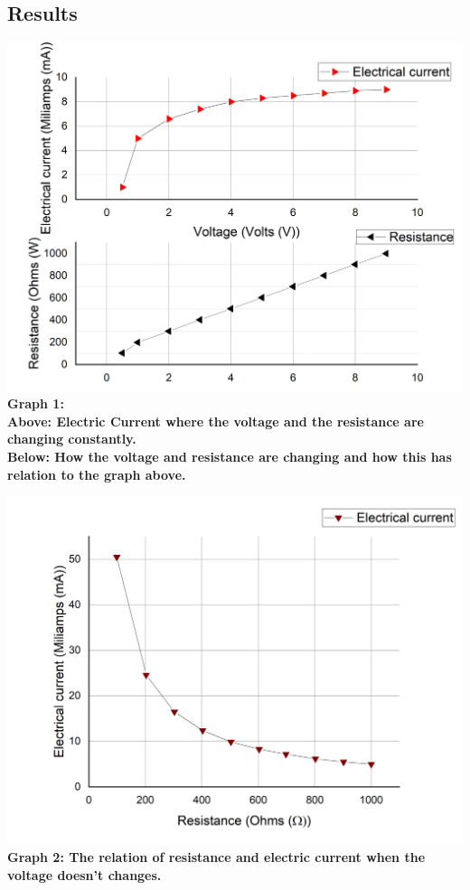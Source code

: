 \documentclass[a4paper,10pt]{article}
\begin{document}
\begin{multicols}{2}
\section{\textcolor{MiColor1}{\textbf{Results}}}
\vspace{2em}
\begin{center}
      \includegraphics[scale=0.3]{Images/Graph1.png}
      \textcolor{MiColor2}{\textbf{Graph 1:\\ Above: Electric Current where the voltage and the resistance are changing constantly.\\Below: How the voltage and resistance are changing and how this has relation to the graph above.}}
\end{center}
\vspace{2em}
\begin{center}
   \includegraphics[scale=0.3]{Images/Graph2.png}
    \textcolor{MiColor2}{\textbf{Graph 2: The relation of resistance and electric current when the voltage doesn't changes.}}
\end{center}
\vfill
\newpage


\end{multicols}
\end{document}
